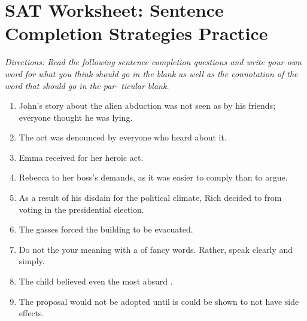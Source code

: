 \section{SAT Worksheet: Sentence Completion Strategies Practice}

\textit{Directions: Read the following sentence completion questions and write your own word for what
you think should go in the blank as well as the connotation of the word that should go in the par-
ticular blank.} 

\begin{enumerate}
\item John’s story about the alien abduction was not seen as by \underline{\hspace{2in}} his friends; everyone thought he was lying.

\item The \underline{\hspace{2in}} act was denounced by everyone who heard about it.

\item Emma received \underline{\hspace{2in}} for her heroic act.

\item Rebecca \underline{\hspace{2in}} to her boss’s demands, as it was easier to comply than to argue.

\item As a result of his disdain for the political climate, Rich decided to \hrulefill from voting in the presidential election.

\item The \underline{\hspace{2in}} gasses forced the building to be evacuated.

\item Do not \underline{\hspace{2in}} the your meaning with a \underline{\hspace{2in}} of fancy words. Rather, speak clearly and simply. 

\item The \underline{\hspace{2in}} child believed even the  most absurd \hrulefill.

\item The \underline{\hspace{2in}} proposal would not be adopted until is could be shown to not have \underline{\hspace{2in}} side effects.
\end{enumerate}
  
